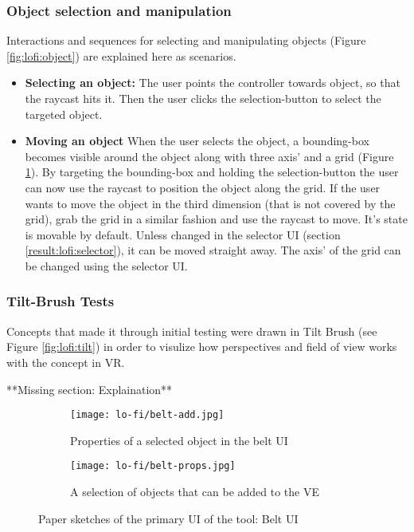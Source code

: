 \subsubsection{Object selection and manipulation}
Interactions and sequences for selecting and manipulating objects (Figure \ref{fig:lofi:object}) are explained here as scenarios.
\begin{itemize}
  \item \textbf{Selecting an object:} The user points the controller towards object, so that the raycast hits it. Then the user clicks the selection-button to select the targeted object.
  \item \textbf{Moving an object} When the user selects the object, a bounding-box becomes visible around the object along with three axis' and a grid (Figure \ref{fig:lofi:belt-ui:props}). By targeting the bounding-box and holding the selection-button the user can now use the raycast to position the object along the grid. If the user wants to move the object in the third dimension (that is not covered by the grid), grab the grid in a similar fashion and use the raycast to move. It's state is movable by default. Unless changed in the selector UI (section \ref{result:lofi:selector}), it can be moved straight away. The axis' of the grid can be changed using the selector UI.
\end{itemize}


\subsubsection{Tilt-Brush Tests}
Concepts that made it through initial testing were drawn in Tilt Brush (see Figure \ref{fig:lofi:tilt}) in order to visulize how perspectives and field of view works with the concept in VR.

**Missing section: Explaination**


\begin{figure}
\begin{subfigure}{.5\textwidth}
  \centering
  \texttt{[image: lo-fi/belt-add.jpg]}
  \caption{Properties of a selected object in the belt UI}
  \label{fig:lofi:belt-ui:props}
\end{subfigure}%
\begin{subfigure}{.5\textwidth}
  \centering
  \texttt{[image: lo-fi/belt-props.jpg]}
  \caption{A selection of objects that can be added to the VE}
  \label{fig:lofi:belt-ui:add}
\end{subfigure}
\caption{Paper sketches of the primary UI of the tool: Belt UI}
\label{fig:lofi:belt-ui}
\end{figure}

